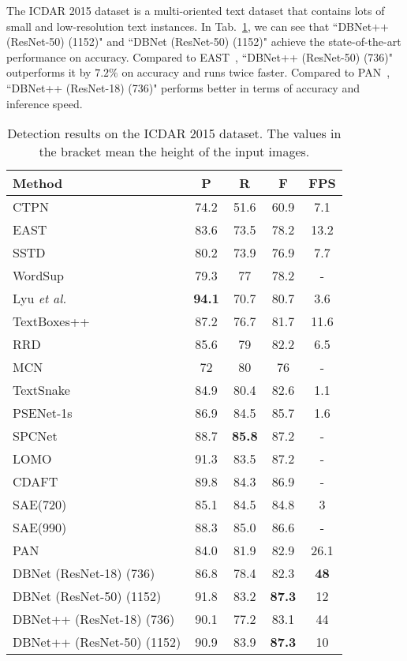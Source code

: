 The ICDAR 2015 dataset is a multi-oriented text dataset that contains lots of small and low-resolution text instances.
In Tab.~\ref{tab:ic15}, we can see that ``DBNet++ (ResNet-50) (1152)" and ``DBNet (ResNet-50) (1152)" achieve the state-of-the-art performance on accuracy. 
Compared to EAST~\cite{east}, ``DBNet++ (ResNet-50) (736)" outperforms it by $7.2\%$ on accuracy and runs twice faster. Compared to PAN~\cite{wang2019efficient}, ``DBNet++ (ResNet-18) (736)" performs better in terms of accuracy and inference speed. 

\begin{table}[ht]
\setlength{\tabcolsep}{9.5pt}
\centering
\caption{Detection results on the ICDAR 2015 dataset. The values in the bracket mean the height of the input images.}
\begin{tabularx}{1.0\linewidth}{lc*{3}c}
\toprule
Method        & P    & R    & F    & FPS  \\ \midrule
CTPN~\cite{eccv/TianHHH016}          & 74.2 & 51.6 & 60.9 & 7.1  \\ 
EAST~\cite{east}          & 83.6 & 73.5 & 78.2 & 13.2 \\ 
SSTD~\cite{sstd}          & 80.2 & 73.9 & 76.9 & 7.7  \\ 
WordSup~\cite{hu2017wordsup}       & 79.3 & 77   & 78.2 & -  \\ 
Lyu \textit{et al.}~\cite{lyu2018multi}    & \textbf{94.1} & 70.7 & 80.7 & 3.6  \\ 
TextBoxes++~\cite{TextBoxes++}   & 87.2 & 76.7 & 81.7 & 11.6 \\ 
RRD~\cite{liao2018rotation}           & 85.6 & 79   & 82.2 & 6.5  \\ 
MCN~\cite{mcn}           & 72   & 80   & 76   & -  \\ 
TextSnake~\cite{long2018textsnake}     & 84.9 & 80.4 & 82.6 & 1.1  \\ 
PSENet-1s~\cite{wang2019shape}    & 86.9 & 84.5 & 85.7 & 1.6  \\ 
SPCNet~\cite{spc}       & 88.7 & \textbf{85.8} & 87.2 & -  \\ 
LOMO~\cite{lomo}      & 91.3 & 83.5 & 87.2 & -  \\ 
CDAFT~\cite{craft}      & 89.8 & 84.3 & 86.9 & -  \\ 
SAE(720)~\cite{tian2019learning}  & 85.1  & 84.5  & 84.8  & 3       \\ 
SAE(990)~\cite{tian2019learning}  & 88.3   & 85.0  & 86.6  & -       \\ 
PAN~\cite{wang2019efficient}  & 84.0   & 81.9  & 82.9  & 26.1       \\ 
\midrule  
DBNet (ResNet-18) (736)~\cite{LiaoWYCB20} & 86.8 & 78.4 & 82.3 & \textbf{48}   \\ 
DBNet (ResNet-50) (1152)~\cite{LiaoWYCB20} & 91.8   & 83.2 & \textbf{87.3} & 12   \\ 
\midrule  
DBNet++ (ResNet-18) (736) & 90.1 & 77.2 & 83.1 & 44  \\ 
DBNet++ (ResNet-50) (1152) & 90.9 & 83.9 & \textbf{87.3} & 10   \\ 
\bottomrule
\end{tabularx}
\label{tab:ic15}
\end{table}


